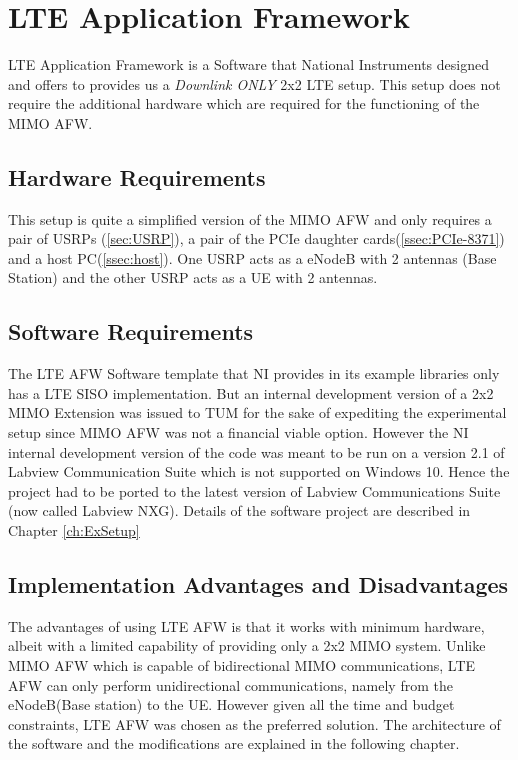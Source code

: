 \section{LTE Application Framework}\label{sec:LTEAFW}

        LTE Application Framework is a Software that National Instruments designed and offers to provides us a \emph{Downlink ONLY} 2x2 LTE setup. This setup does not require the additional hardware which are required for the functioning of the MIMO AFW.

        \subsection{Hardware Requirements}\label{ssec:LTEAFWHW}
        This setup is quite a simplified version of the MIMO AFW and only requires a pair of USRPs (\ref{sec:USRP}), a pair of the PCIe daughter cards(\ref{ssec:PCIe-8371}) and a host PC(\ref{ssec:host}). One USRP acts as a eNodeB with 2 antennas (Base Station) and the other USRP acts as a UE with 2 antennas.

        \subsection{Software Requirements}\label{ssec:LTEAFWSW}
        The LTE AFW Software template that NI provides in its example libraries only has a LTE SISO implementation. But an internal development version of a 2x2 MIMO Extension was issued to TUM for the sake of expediting the experimental setup since MIMO AFW was not a financial viable option. However the NI internal development version of the code was meant to be run on a version 2.1 of Labview Communication Suite which is not supported on Windows 10. Hence the project had to be ported to the latest version of Labview Communications Suite (now called Labview NXG). Details of the software project are described in Chapter \ref{ch:ExSetup}

        \subsection{Implementation Advantages and Disadvantages}\label{ssec:LTEAFWADVDISADV}
        The advantages of using LTE AFW is that it works with minimum hardware, albeit with a limited capability of providing only a 2x2 MIMO system. Unlike MIMO AFW which is capable of bidirectional MIMO communications, LTE AFW can only perform unidirectional communications, namely from the eNodeB(Base station) to the UE. However given all the time and budget constraints, LTE AFW was chosen as the preferred solution. The architecture of the software and the modifications are explained in the following chapter.


